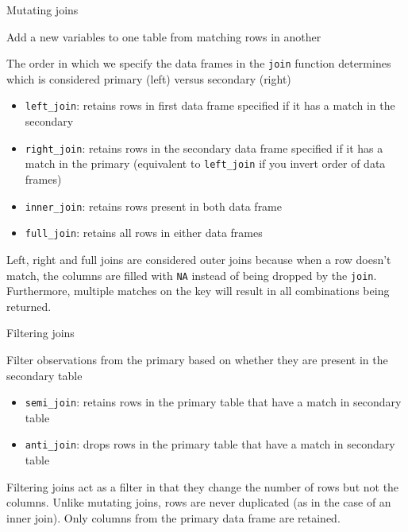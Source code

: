 \documentclass[ignorenonframetext,]{beamer}
\providecommand{\tightlist}{%
  \setlength{\itemsep}{0pt}\setlength{\parskip}{0pt}}
\begin{document}
\begin{frame}[fragile]{Mutating joins}

\begin{block}{Add a new variables to one table from matching rows in
another}

The order in which we specify the data frames in the \texttt{join}
function determines which is considered primary (left) versus secondary
(right)

\begin{itemize}
\tightlist
\item
  \texttt{left\_join}: retains rows in first data frame specified if it
  has a match in the secondary
\item
  \texttt{right\_join}: retains rows in the secondary data frame
  specified if it has a match in the primary (equivalent to
  \texttt{left\_join} if you invert order of data frames)
\item
  \texttt{inner\_join}: retains rows present in both data frame\\
\item
  \texttt{full\_join}: retains all rows in either data frames
\end{itemize}

Left, right and full joins are considered outer joins because when a row
doesn't match, the columns are filled with \texttt{NA} instead of being
dropped by the \texttt{join}. Furthermore, multiple matches on the key
will result in all combinations being returned.

\end{block}

\end{frame}

\begin{frame}[fragile]{Filtering joins}

\begin{block}{Filter observations from the primary based on whether they
are present in the secondary table}

\begin{itemize}
\tightlist
\item
  \texttt{semi\_join}: retains rows in the primary table that have a
  match in secondary table
\item
  \texttt{anti\_join}: drops rows in the primary table that have a match
  in secondary table
\end{itemize}

Filtering joins act as a filter in that they change the number of rows
but not the columns. Unlike mutating joins, rows are never duplicated
(as in the case of an inner join). Only columns from the primary data
frame are retained.

\end{block}

\end{frame}
\end{document}
